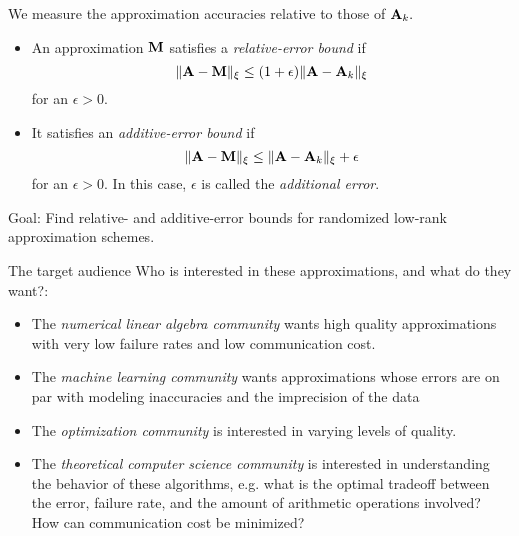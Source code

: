 \documentclass[xcolor={svgnames,pdftex,dvipsnames,table},10pt]{beamer} %
\begin{document}
\begin{frame}
 We measure the approximation accuracies relative to those of $\mathbf{A}_k.$
 
 \begin{itemize}
  \item An approximation $\mathbf{M}$ satisfies a \emph{relative-error bound} if
           \[
           \|\mathbf{A} - \mathbf{M}\|_\xi \leq (1 + \epsilon) \|\mathbf{A} - \mathbf{A}_k\|_\xi 
           \]
  for an $\epsilon > 0.$
  
  \item It satisfies an \emph{additive-error bound} if 
           \[
            \|\mathbf{A} - \mathbf{M}\|_\xi \leq \|\mathbf{A} - \mathbf{A}_k\|_\xi + \epsilon
           \]
  for an $\epsilon > 0.$ In this case, $\epsilon$ is called the \emph{additional error}.
 \end{itemize}

 
\begin{displaybox}{0.7\linewidth}
\parbox{\linewidth}{Goal: Find relative- and additive-error bounds for randomized low-rank approximation schemes.}
\end{displaybox}
 
\end{frame}

\begin{frame}{The target audience}
 Who is interested in these approximations, and what do they want?:
 \begin{itemize}
  \item The \emph{numerical linear algebra community} wants high quality approximations
  with very low failure rates and low communication cost.
  \item The \emph{machine learning community} wants approximations whose errors are on par
  with modeling inaccuracies and the imprecision of the data
  \item The \emph{optimization community} is interested in varying levels of quality.
  \item The \emph{theoretical computer science community} is interested in understanding the
  behavior of these algorithms, e.g. what is the optimal tradeoff between the error, failure rate,
  and the amount of arithmetic operations involved? How can communication cost be minimized?
 \end{itemize}
\end{frame}
\end{document}
